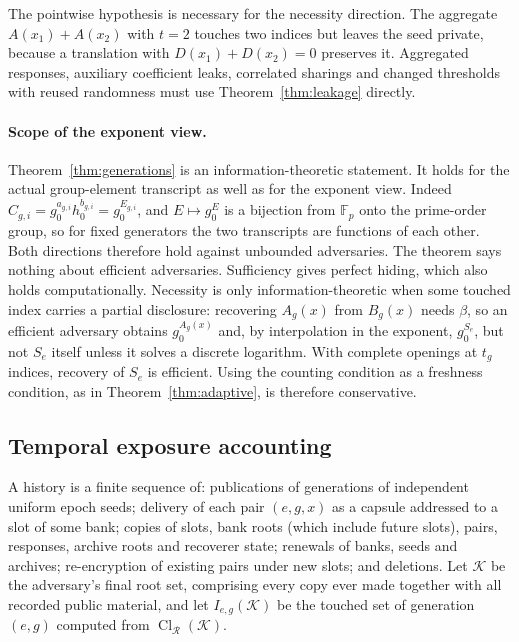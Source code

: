 \documentclass[pdflatex,sn-mathphys-num,twocolumn]{sn-jnl}
\theoremstyle{plain}
\theoremstyle{definition}
\newcommand{\Cl}{\operatorname{Cl}}
\newcommand{\F}{\mathbb{F}}
\begin{document}
The pointwise hypothesis is necessary for the necessity direction. The aggregate $A(x_1)+A(x_2)$ with $t=2$ touches two indices but leaves the seed private, because a translation with $D(x_1)+D(x_2)=0$ preserves it. Aggregated responses, auxiliary coefficient leaks, correlated sharings and changed thresholds with reused randomness must use Theorem~\ref{thm:leakage} directly.

\paragraph{Scope of the exponent view.}
Theorem~\ref{thm:generations} is an information-theoretic statement. It holds for the actual group-element transcript as well as for the exponent view. Indeed $C_{g,i}=g_0^{a_{g,i}}h_0^{b_{g,i}}=g_0^{E_{g,i}}$, and $E\mapsto g_0^E$ is a bijection from $\F_p$ onto the prime-order group, so for fixed generators the two transcripts are functions of each other. Both directions therefore hold against unbounded adversaries. The theorem says nothing about efficient adversaries. Sufficiency gives perfect hiding, which also holds computationally. Necessity is only information-theoretic when some touched index carries a partial disclosure: recovering $A_g(x)$ from $B_g(x)$ needs $\beta$, so an efficient adversary obtains $g_0^{A_g(x)}$ and, by interpolation in the exponent, $g_0^{S_e}$, but not $S_e$ itself unless it solves a discrete logarithm. With complete openings at $t_g$ indices, recovery of $S_e$ is efficient. Using the counting condition as a freshness condition, as in Theorem~\ref{thm:adaptive}, is therefore conservative.

\subsection{Temporal exposure accounting}
A history is a finite sequence of: publications of generations of independent uniform epoch seeds; delivery of each pair $(e,g,x)$ as a capsule addressed to a slot of some bank; copies of slots, bank roots (which include future slots), pairs, responses, archive roots and recoverer state; renewals of banks, seeds and archives; re-encryption of existing pairs under new slots; and deletions. Let $\mathcal K$ be the adversary's final root set, comprising every copy ever made together with all recorded public material, and let $I_{e,g}(\mathcal K)$ be the touched set of generation $(e,g)$ computed from $\Cl_{\mathcal R}(\mathcal K)$.
\end{document}

